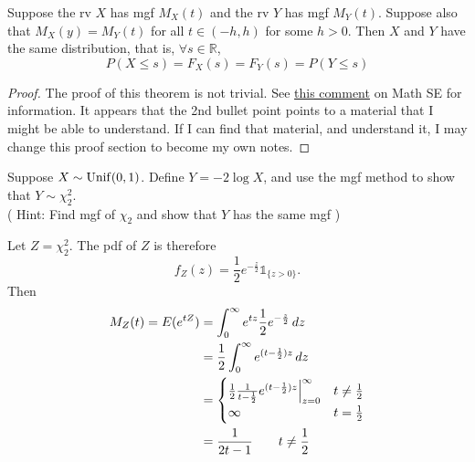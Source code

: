 \documentclass[notoc,notitlepage]{tufte-book}
\begin{document}
\begin{thm}
\label{thm:uniqueness_of_the_mgf}
  Suppose the rv $X$ has mgf $M_X(t)$ and the rv $Y$ has mgf $M_Y(t)$. Suppose also that $M_X(y) = M_Y(t)$ for all $t \in (-h, h)$ for some $h > 0$. Then $X$ and $Y$ have the same distribution, that is, $\forall s \in \mathbb{R}$,
  \begin{equation*}
    P(X \leq s) = F_X(s) = F_Y(s) = P(Y \leq s)
  \end{equation*}
\end{thm}

\begin{proof}
  The proof of this theorem is not trivial. See \href{https://math.stackexchange.com/q/2388038}{this comment} on Math SE for information. It appears that the 2nd bullet point points to a material that I might be able to understand. If I can find that material, and understand it, I may change this proof section to become my own notes.
\end{proof}

\begin{eg}[Example 2.29]
  Suppose $X \sim \operatorname{Unif}(0, 1)$. Define $Y = -2 \log X$, and use the mgf method to show that $Y \sim \chi_2^2$.\\
\noindent ( Hint: Find mgf of $\chi_2$ and show that $Y$ has the same mgf )

  \begin{solution}
    Let $Z = \chi_2^2$. The pdf of $Z$ is therefore
    \begin{equation*}
      f_Z (z) = \frac{1}{2} e^{- \frac{z}{2}} \mathbb{1}_{\{z > 0\}}.
    \end{equation*}
    Then
    \begin{align*}
      M_Z(t) = E(e^{tZ}) &= \int_{0}^{\infty} e^{tz} \frac{1}{2} e^{- \frac{z}{2}} \mathop{}\!d{z} \\
        &= \frac{1}{2} \int_{0}^{\infty} e^{(t - \frac{1}{2}) z} \mathop{}\!d{z} \\
        &= \begin{cases} 
          \frac{1}{2} \frac{1}{t - \frac{1}{2}} e^{(t - \frac{1}{2}) z} \Big|_{z = 0}^{\infty} & t \neq \frac{1}{2} \\
          \infty & t = \frac{1}{2}
        \end{cases} \\
        &= \frac{1}{2t - 1} \qquad t \neq \frac{1}{2}
    \end{align*}
  \end{solution}
\end{eg}
\end{document}

